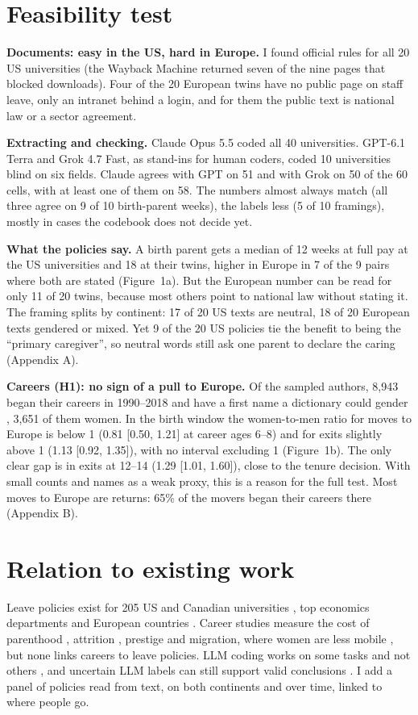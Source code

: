 \documentclass[10pt,twocolumn]{article}
\begin{document}
\section{Feasibility test}
\textbf{Documents: easy in the US, hard in Europe.} I found official rules for all 20 US universities (the Wayback Machine returned seven of the nine pages that blocked downloads). Four of the 20 European twins have no public page on staff leave, only an intranet behind a login, and for them the public text is national law or a sector agreement.

\textbf{Extracting and checking.} Claude Opus 5.5 coded all 40 universities. GPT-6.1 Terra and Grok 4.7 Fast, as stand-ins for human coders, coded 10 universities blind on six fields. Claude agrees with GPT on 51 and with Grok on 50 of the 60 cells, with at least one of them on 58. The numbers almost always match (all three agree on 9 of 10 birth-parent weeks), the labels less (5 of 10 framings), mostly in cases the codebook does not decide yet.

\textbf{What the policies say.} A birth parent gets a median of 12 weeks at full pay at the US universities and 18 at their twins, higher in Europe in 7 of the 9 pairs where both are stated (Figure~1a). But the European number can be read for only 11 of 20 twins, because most others point to national law without stating it. The framing splits by continent: 17 of 20 US texts are neutral, 18 of 20 European texts gendered or mixed. Yet 9 of the 20 US policies tie the benefit to being the ``primary caregiver'', so neutral words still ask one parent to declare the caring (Appendix A).

\textbf{Careers (H1): no sign of a pull to Europe.} Of the sampled authors, 8,943 began their careers in 1990--2018 and have a first name a dictionary could gender \citep{genderguesser}, 3,651 of them women. In the birth window the women-to-men ratio for moves to Europe is below 1 (0.81 [0.50, 1.21] at career ages 6--8) and for exits slightly above 1 (1.13 [0.92, 1.35]), with no interval excluding 1 (Figure~1b). The only clear gap is in exits at 12--14 (1.29 [1.01, 1.60]), close to the tenure decision. With small counts and names as a weak proxy, this is a reason for the full test. Most moves to Europe are returns: 65\% of the movers began their careers there (Appendix B).

\section{Relation to existing work}
Leave policies exist for 205 US and Canadian universities \citep{morgan2018}, top economics departments \citep{antecol2018} and European countries \citep{spitzer2026}. Career studies measure the cost of parenthood \citep{morgan2021}, attrition \citep{spoon2023}, prestige \citep{wapman2022} and migration, where women are less mobile \citep{zhao2023}, but none links careers to leave policies. LLM coding works on some tasks and not others \citep{bamman2024,than2025}, and uncertain LLM labels can still support valid conclusions \citep{gligoric2025}. I add a panel of policies read from text, on both continents and over time, linked to where people go.
\end{document}
